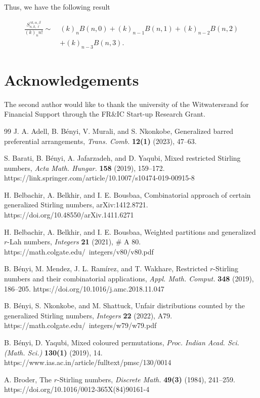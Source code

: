 \documentclass[12pt, reqno]{amsart}
\newtheorem{proof 1}{proof 1}
\begin{document}
Thus, we have the following result

\begin{align*}	\frac{S^{\gamma k,\alpha,\beta}_{n,k,\ell}}{(k)_nn!}\sim\: & (k)_nB(n,0)+(k)_{n-1}B(n,1)+(k)_{n-2}B(n,2)\\&+(k)_{n-3}B(n,3).\end{align*}

\section*{Acknowledgements}
The second author would like to thank the university of the Witwatersrand for Financial Support through the FR\&IC Start-up Research Grant.
 \begin{thebibliography}{99}
 J. A. Adell,  B. Bényi, V. Murali, and S. Nkonkobe, Generalized barred preferential arrangements, \textit{Trans. Comb.} \textbf{12(1)} (2023), 47--63. 
 
 S. Barati, B. Bényi, A. Jafarzadeh, and D. Yaqubi, Mixed restricted Stirling numbers, \textit{Acta Math. Hungar.} \textbf{158} (2019), 159--172. https://link.springer.com/article/10.1007/s10474-019-00915-8

 
 H. Belbachir, A. Belkhir, and I. E. Bousbaa, Combinatorial approach of certain generalized Stirling numbers, arXiv:1412.8721. https://doi.org/10.48550/arXiv.1411.6271


  H. Belbachir, A. Belkhir, and I. E. Bousbaa, Weighted partitions and generalized $r$-Lah numbers, \textit{Integers} \textbf{21} (2021), $\#$ A 80. https://math.colgate.edu/~integers/v80/v80.pdf

 B. Bényi, M. Mendez, J. L. Ramírez, and T. Wakhare, Restricted $r$-Stirling numbers and their combinatorial applications, \textit{Appl. Math. Comput.} \textbf{348} (2019), 186--205. https://doi.org/10.1016/j.amc.2018.11.047

B. Bényi,  S. Nkonkobe, and M. Shattuck, Unfair distributions counted by the generalized Stirling numbers, \textit{Integers} \textbf{22} (2022), A79. https://math.colgate.edu/~integers/w79/w79.pdf

 B. Bényi, D. Yaqubi, Mixed coloured permutations, \textit{Proc. Indian Acad. Sci. (Math. Sci.) } \textbf{130(1)} (2019), 14. https://www.ias.ac.in/article/fulltext/pmsc/130/0014


 A. Broder, The $r$-{S}tirling numbers, \textit{Discrete Math.} \textbf{49(3)} (1984), 241--259. https://doi.org/10.1016/0012-365X(84)90161-4
 

\end{thebibliography}
\end{document}
